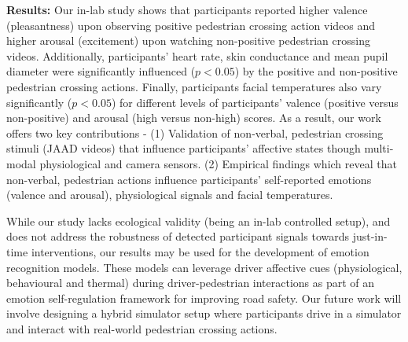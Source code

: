 \documentclass[acmlarge]{acmart}
\begin{document}
\noindent \textbf{Results:} 
Our in-lab study shows that participants reported higher valence (pleasantness) upon observing positive pedestrian crossing action videos and higher arousal (excitement) upon watching non-positive pedestrian crossing videos. Additionally, participants' heart rate, skin conductance and mean pupil diameter were significantly influenced ($p<0.05$) by the positive and non-positive pedestrian crossing actions. Finally, participants facial temperatures also vary significantly ($p<0.05$) for different levels of participants' valence (positive versus non-positive) and arousal (high versus non-high) scores. As a result, our work offers two key contributions -  (1) Validation of non-verbal, pedestrian crossing stimuli (JAAD videos) that influence participants' affective states though multi-modal physiological and camera sensors. (2) Empirical findings which reveal that non-verbal, pedestrian actions influence participants' self-reported emotions (valence and arousal), physiological signals and facial temperatures. 

While our study lacks ecological validity (being an in-lab controlled setup), and does not address the robustness of detected participant signals towards just-in-time interventions, our results may be used for the development of emotion recognition models. These models can leverage driver affective cues (physiological, behavioural and thermal) during driver-pedestrian interactions as part of an emotion self-regulation framework for improving road safety. Our future work will involve designing a hybrid simulator setup where participants drive in a simulator and interact with real-world pedestrian crossing actions. 





\end{document}

